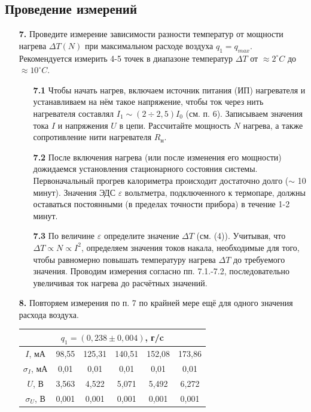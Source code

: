 \documentclass[a4paper, 12pt]{article}%
\begin{document}
\subsection*{Проведение измерений}
\begin{enumerate}
\item [\textbf{7.}]Проведите измерение зависимости разности температур от мощности нагрева $\Delta T (N)$ при максимальном расходе воздуха $q_1 = q_{max}$. Рекомендуется измерить 4-5 точек в диапазоне температур $\Delta T$ от $\approx 2^{\circ}C$ до $\approx 10^{\circ}C$.
\begin{enumerate}
\item [\textbf{7.1}] Чтобы начать нагрев, включаем источник питания (ИП) нагревателя и устанавливаем на нём такое напряжение, чтобы ток через нить нагревателя составлял $I_1 \sim (2 \div 2,5)I_0$ (см. п. 6). Записываем значения тока $I$ и напряжения $U$ в цепи. Рассчитайте мощность $N$ нагрева, а также сопротивление нити нагревателя $R_{\text{н}}$.
\item [\textbf{7.2}] После включения нагрева (или после изменения его мощности) дожидаемся установления стационарного состояния системы. Первоначальный прогрев калориметра происходит достаточно долго ($\sim$ 10 минут). Значения ЭДС $\varepsilon$ вольтметра, подключенного к термопаре, должны оставаться постоянными (в пределах точности прибора) в течение 1-2 минут.
\item [\textbf{7.3}] По величине $\varepsilon$ определите значение $\Delta T$ (см. (4)). Учитывая, что $\Delta T \varpropto N \varpropto I^2$, определяем значения токов накала, необходимые для того, чтобы равномерно повышать температуру нагрева $\Delta T$ до требуемого значения. Проводим измерения согласно пп. 7.1.-7.2, последовательно увеличивая ток нагрева до расчётных значений.
\end{enumerate}
\item [\textbf{8.}] Повторяем измерения по п. 7 по крайней мере ещё для одного значения расхода воздуха.
\begin{center}
\begin{tabular}{|c|c|c|c|c|c|}
\hline
\multicolumn{6}{|c|}{$q_1 = (0,238 \pm0,004)$, г/c} \\ \hline
$I$, мА & 98,55 & 125,31 & 140,51 & 152,08 & 173,86 \\ \hline
$\sigma_I$, мА & 0,01 & 0,01 & 0,01 & 0,01 & 0,01 \\ \hline
$U$, В & 3,563 & 4,522 & 5,071 & 5,492 & 6,272 \\ \hline
$\sigma_U$, В & 0,001 & 0,001 & 0,001 & 0,001 & 0,001 \\ \hline

\end{tabular}
\end{center}
\end{enumerate}
\end{document}
